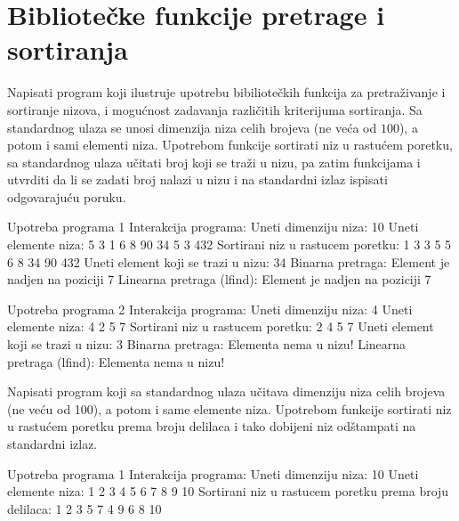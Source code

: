 \section{Bibliotečke funkcije pretrage i sortiranja}
\begin{Exercise}[label=517]
  Napisati program koji ilustruje upotrebu bibiliotečkih funkcija za
  pretraživanje i sortiranje nizova, i mogućnost zadavanja različitih
  kriterijuma sortiranja. Sa standardnog ulaza se unosi dimenzija niza
  celih brojeva (ne veća od $100$), a potom i sami elementi
  niza. Upotrebom funkcije  sortirati niz u rastućem
  poretku, sa standardnog ulaza učitati broj koji se traži u nizu, pa
  zatim funkcijama  i  utvrditi da li se
  zadati broj nalazi u nizu i na standardni izlaz ispisati
  odgovarajuću poruku.
  
\begin{miditest}
\begin{test}{Upotreba programa 1}
Interakcija programa:    
  Uneti dimenziju niza: 10
  Uneti elemente niza:
  5 3 1 6 8 90 34 5 3 432
  Sortirani niz u rastucem poretku:
  1 3 3 5 5 6 8 34 90 432 
  Uneti element koji se trazi u nizu: 34
  Binarna pretraga: 
  Element je nadjen na poziciji 7
  Linearna pretraga (lfind): 
  Element je nadjen na poziciji 7
\end{test}
\end{miditest}
\begin{miditest}
\begin{test}{Upotreba programa 2}
Interakcija programa:
  Uneti dimenziju niza: 4
  Uneti elemente niza:
  4 2 5 7
  Sortirani niz u rastucem poretku:
  2 4 5 7 
  Uneti element koji se trazi u nizu: 3
  Binarna pretraga: 
  Elementa nema u nizu!
  Linearna pretraga (lfind): 
  Elementa nema u nizu!
\end{test}
\end{miditest}
  
\end{Exercise}

\begin{Answer}[ref=517]
\end{Answer}
\begin{Exercise}[label=518]
  Napisati program koji sa standardnog ulaza učitava dimenziju niza
  celih brojeva (ne veću od 100), a potom i same elemente
  niza. Upotrebom funkcije  sortirati niz u rastućem
  poretku prema broju delilaca i tako dobijeni niz odštampati na
  standardni izlaz.
  
\begin{maxitest}
\begin{test}{Upotreba programa 1}
Interakcija programa:
  Uneti dimenziju niza: 10
  Uneti elemente niza:
  1 2 3 4 5 6 7 8 9 10
  Sortirani niz u rastucem poretku prema broju delilaca:
  1 2 3 5 7 4 9 6 8 10  
\end{test}
\end{maxitest}
  
\end{Exercise}

